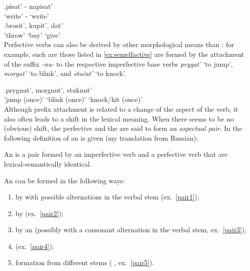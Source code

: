 \exg.\label{ex:asppair}pisat'\textsuperscript{\IPF} - napisat'\textsuperscript{\PF}\\
`write' - `write'\\

\exg.\label{ex:unprefperf}brosit'\textsuperscript{\PF}, kupit'\textsuperscript{\PF}, dat'\textsuperscript{\PF}\\
'throw' `buy' `give'\\

Perfective verbs can also be derived by other morphological means than : for example,    such are those listed in \ref{ex:semelfactive} are formed by the attachment of the suffix \textit{-nu-} to the respective imperfective base verbs \textit{prygat'} `to jump', \textit{morgat'} `to blink', and \textit{stu\v{c}at'} `to knock'.

\exg.\label{ex:semelfactive}prygnut'\textsuperscript{\PF}, morgnut'\textsuperscript{\PF}, stuknut'\textsuperscript{\PF}\\
{'jump (once)'} {`blink (once)'} {`knock/hit (once)'}\\

Although prefix attachment is related to a change of the aspect of the verb, it also often leads to a shift in the lexical meaning. When there seems to be no (obvious) shift, the perfective and the  are said to form an \textit{aspectual pair}. In \cite{Rosenthal:76} the following definition of an  is given (my translation from Russian):
\begin{definition}\label{def:pair}
An  is a pair formed by an imperfective verb and a perfective verb that are lexical-semantically identical.
\end{definition}
\noindent An  can be formed in the following ways:

\begin{enumerate}[noitemsep]
\item by  with possible alternations in the verbal stem (ex.~\ref{pair1});
\item by  (ex.~\ref{pair2});
\item by an  (possibly with a consonant alternation in the verbal stem, ex.~\ref{pair3});
\item {} (ex.~\ref{pair4});
\item formation from different stems ( , ex.~\ref{pair5}).
\end{enumerate}


